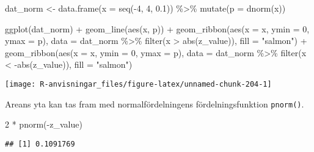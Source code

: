 \documentclass[
]{book}
\newenvironment{Shaded}{\begin{snugshade}}{\end{snugshade}}
\newcommand{\AttributeTok}[1]{\textcolor[rgb]{0.77,0.63,0.00}{#1}}
\newcommand{\DecValTok}[1]{\textcolor[rgb]{0.00,0.00,0.81}{#1}}
\newcommand{\FloatTok}[1]{\textcolor[rgb]{0.00,0.00,0.81}{#1}}
\newcommand{\FunctionTok}[1]{\textcolor[rgb]{0.00,0.00,0.00}{#1}}
\newcommand{\NormalTok}[1]{#1}
\newcommand{\OtherTok}[1]{\textcolor[rgb]{0.56,0.35,0.01}{#1}}
\newcommand{\SpecialCharTok}[1]{\textcolor[rgb]{0.00,0.00,0.00}{#1}}
\newcommand{\StringTok}[1]{\textcolor[rgb]{0.31,0.60,0.02}{#1}}
\theoremstyle{definition}
\theoremstyle{definition}
\theoremstyle{definition}
\theoremstyle{definition}
\theoremstyle{remark}
\begin{document}
\begin{Shaded}
\begin{Highlighting}[]
\NormalTok{dat\_norm }\OtherTok{\textless{}{-}} \FunctionTok{data.frame}\NormalTok{(}\AttributeTok{x =} \FunctionTok{seq}\NormalTok{(}\SpecialCharTok{{-}}\DecValTok{4}\NormalTok{, }\DecValTok{4}\NormalTok{, }\FloatTok{0.1}\NormalTok{)) }\SpecialCharTok{\%\textgreater{}\%} 
  \FunctionTok{mutate}\NormalTok{(}\AttributeTok{p =} \FunctionTok{dnorm}\NormalTok{(x))}

\FunctionTok{ggplot}\NormalTok{(dat\_norm) }\SpecialCharTok{+}
  \FunctionTok{geom\_line}\NormalTok{(}\FunctionTok{aes}\NormalTok{(x, p)) }\SpecialCharTok{+}
  \FunctionTok{geom\_ribbon}\NormalTok{(}\FunctionTok{aes}\NormalTok{(}\AttributeTok{x =}\NormalTok{ x, }\AttributeTok{ymin =} \DecValTok{0}\NormalTok{, }\AttributeTok{ymax =}\NormalTok{ p), }\AttributeTok{data =}\NormalTok{ dat\_norm }\SpecialCharTok{\%\textgreater{}\%} \FunctionTok{filter}\NormalTok{(x }\SpecialCharTok{\textgreater{}} \FunctionTok{abs}\NormalTok{(z\_value)), }\AttributeTok{fill =} \StringTok{"salmon"}\NormalTok{) }\SpecialCharTok{+}
  \FunctionTok{geom\_ribbon}\NormalTok{(}\FunctionTok{aes}\NormalTok{(}\AttributeTok{x =}\NormalTok{ x, }\AttributeTok{ymin =} \DecValTok{0}\NormalTok{, }\AttributeTok{ymax =}\NormalTok{ p), }\AttributeTok{data =}\NormalTok{ dat\_norm }\SpecialCharTok{\%\textgreater{}\%} \FunctionTok{filter}\NormalTok{(x }\SpecialCharTok{\textless{}} \SpecialCharTok{{-}}\FunctionTok{abs}\NormalTok{(z\_value)), }\AttributeTok{fill =} \StringTok{"salmon"}\NormalTok{)}
\end{Highlighting}
\end{Shaded}

\begin{center}\texttt{[image: R-anvisningar\_files/figure-latex/unnamed-chunk-204-1]} \end{center}

Areans yta kan tas fram med normalfördelningens fördelningsfunktion \texttt{pnorm()}.

\begin{Shaded}
\begin{Highlighting}[]
\DecValTok{2} \SpecialCharTok{*} \FunctionTok{pnorm}\NormalTok{(}\SpecialCharTok{{-}}\NormalTok{z\_value)}
\end{Highlighting}
\end{Shaded}

\begin{verbatim}
## [1] 0.1091769
\end{verbatim}
\end{document}
